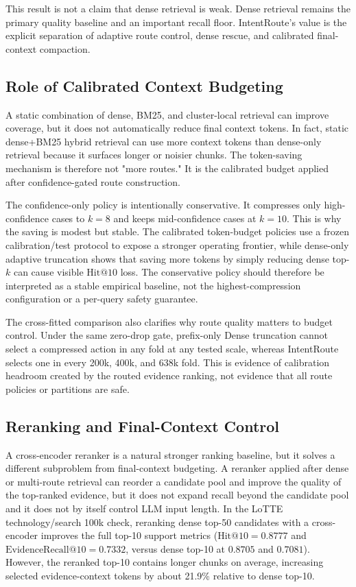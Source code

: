 This result is not a claim that dense retrieval is weak. Dense retrieval remains the primary quality baseline and an important recall floor. IntentRoute's value is the explicit separation of adaptive route control, dense rescue, and calibrated final-context compaction.

\subsection{Role of Calibrated Context Budgeting}
\label{sec:07-discussion:role-of-calibrated-context-budgeting}

A static combination of dense, BM25, and cluster-local retrieval can improve coverage, but it does not automatically reduce final context tokens. In fact, static dense+BM25 hybrid retrieval can use more context tokens than dense-only retrieval because it surfaces longer or noisier chunks. The token-saving mechanism is therefore not "more routes." It is the calibrated budget applied after confidence-gated route construction.

The confidence-only policy is intentionally conservative. It compresses only high-confidence cases to $k=8$ and keeps mid-confidence cases at $k=10$. This is why the saving is modest but stable. The calibrated token-budget policies use a frozen calibration/test protocol to expose a stronger operating frontier, while dense-only adaptive truncation shows that saving more tokens by simply reducing dense top-$k$ can cause visible $\mathrm{Hit@10}$ loss. The conservative policy should therefore be interpreted as a stable empirical baseline, not the highest-compression configuration or a per-query safety guarantee.

The cross-fitted comparison also clarifies why route quality matters to budget control. Under the same zero-drop gate, prefix-only Dense truncation cannot select a compressed action in any fold at any tested scale, whereas IntentRoute selects one in every 200k, 400k, and 638k fold. This is evidence of calibration headroom created by the routed evidence ranking, not evidence that all route policies or partitions are safe.

\subsection{Reranking and Final-Context Control}
\label{sec:07-discussion:reranking-and-final-context-control}

A cross-encoder reranker is a natural stronger ranking baseline, but it solves a different subproblem from final-context budgeting. A reranker applied after dense or multi-route retrieval can reorder a candidate pool and improve the quality of the top-ranked evidence, but it does not expand recall beyond the candidate pool and it does not by itself control LLM input length. In the LoTTE technology/search 100k check, reranking dense top-50 candidates with a cross-encoder improves the full top-10 support metrics ($\mathrm{Hit@10}=0.8777$ and $\mathrm{EvidenceRecall@10}=0.7332$, versus dense top-10 at $0.8705$ and $0.7081$). However, the reranked top-10 contains longer chunks on average, increasing selected evidence-context tokens by about 21.9\% relative to dense top-10.

